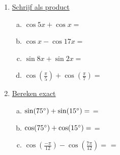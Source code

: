 \documentclass[a4paper,12pt]{article}
\begin{document}
\begin{enumerate}[(1)]
  \item\underline{Schrijf als product}
    \begin{enumerate}[(a)]
      \item $\cos5x+\cos x=$ \dotfill
      \item $\cos x-\cos17x=$ \dotfill
      \item $\sin8x+\sin2x=$ \dotfill
      \item $\cos(\frac{\pi}{5})+\cos(\frac{\pi}{7})=$ \dotfill
    \end{enumerate}
  \item \underline{Bereken exact}
    \begin{enumerate}[(a)]
      \item $\sin(75^\circ)+\sin(15^\circ) =$ \dotfill \newline =\dotfill
      \item $\cos(75^\circ)+\cos(15^\circ) =$ \dotfill \newline =\dotfill
      \item $\cos(\frac{-\pi}{12})-\cos(\frac{7\pi}{12}) =$ \dotfill \newline =\dotfill
    \end{enumerate}
\end{enumerate}

\end{document}
